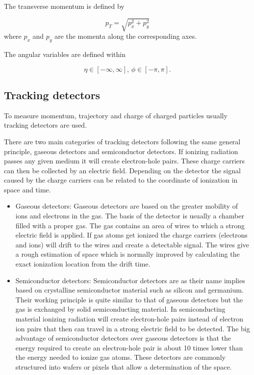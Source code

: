 The transverse momentum is defined by

\begin{equation}
p_T = \sqrt{p_x^2 + p_y^2}
\end{equation}
where $p_x$ and $p_y$ are the momenta along the corresponding axes. 

The angular variables are defined within

\begin{equation}
\eta \in [-\infty,\infty],\,
\phi \in [-\pi,\pi].
\end{equation}
\subsection{Tracking detectors}

To measure momentum, trajectory and charge of charged particles usually tracking detectors are used.

There are two main categories of tracking detectors following the same general principle, gaseous detectors and semiconductor detectors. If ionizing radiation passes any given medium it will create electron-hole pairs. These charge carriers can then be collected by an electric field. Depending on the detector the signal caused by the charge carriers can be related to the coordinate of ionization in space and time.

\begin{itemize}
\item Gaseous detectors: Gaseous detectors are based on the greater mobility of ions and electrons in the gas. The basis of the detector is usually a chamber filled with a proper gas. The gas contains an area of wires to which a strong electric field is applied. If gas atoms get ionized the charge carriers (electrons and ions) will drift to the wires and create a detectable signal. The wires give a rough estimation of space which is normally improved by calculating the exact ionization location from the drift time.

\item Semiconductor detectors: Semiconductor detectors are as their name implies based on crystalline semiconductor material such as silicon and germanium. Their working principle is quite similar to that of gaseous detectors but the gas is exchanged by solid semiconducting material. In semiconducting material ionizing radiation will create electron-hole pairs instead of electron ion pairs that then can travel in a strong electric field to be detected. The big advantage of semiconductor detectors over gaseous detectors is that the energy required to create an electron-hole pair is about 10 times lower than the energy needed to ionize gas atoms. These detectors are commonly structured into wafers or pixels that allow a determination of the space.
\end{itemize}


